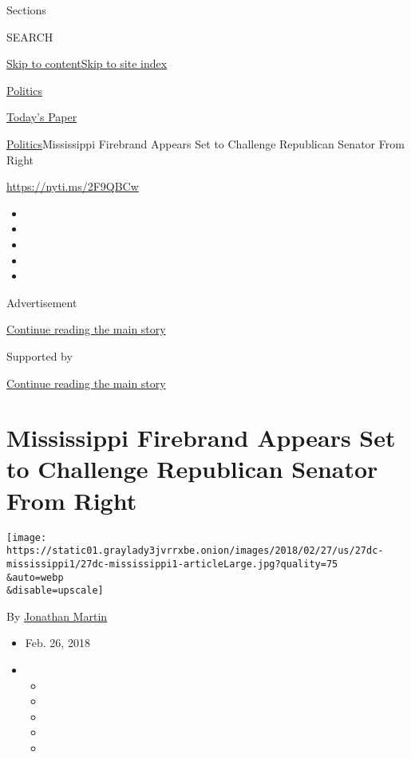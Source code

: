Sections

SEARCH

\protect\hyperlink{site-content}{Skip to
content}\protect\hyperlink{site-index}{Skip to site index}

\href{https://www.nytimes3xbfgragh.onion/section/politics}{Politics}

\href{https://myaccount.nytimes3xbfgragh.onion/auth/login?response_type=cookie\&client_id=vi}{}

\href{https://www.nytimes3xbfgragh.onion/section/todayspaper}{Today's
Paper}

\href{/section/politics}{Politics}\textbar{}Mississippi Firebrand
Appears Set to Challenge Republican Senator From Right

\url{https://nyti.ms/2F9QBCw}

\begin{itemize}
\item
\item
\item
\item
\item
\end{itemize}

Advertisement

\protect\hyperlink{after-top}{Continue reading the main story}

Supported by

\protect\hyperlink{after-sponsor}{Continue reading the main story}

\hypertarget{mississippi-firebrand-appears-set-to-challenge-republican-senator-from-right}{%
\section{Mississippi Firebrand Appears Set to Challenge Republican
Senator From
Right}\label{mississippi-firebrand-appears-set-to-challenge-republican-senator-from-right}}

\texttt{[image: https://static01.graylady3jvrrxbe.onion/images/2018/02/27/us/27dc-mississippi1/27dc-mississippi1-articleLarge.jpg?quality=75\\\&auto=webp\\\&disable=upscale]}

By \href{http://www.nytimes3xbfgragh.onion/by/jonathan-martin}{Jonathan
Martin}

\begin{itemize}
\item
  Feb. 26, 2018
\item
  \begin{itemize}
  \item
  \item
  \item
  \item
  \item
  \end{itemize}
\end{itemize}

